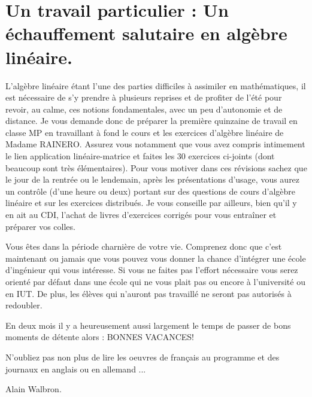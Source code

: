 \section[Un travail particulier]{Un travail particulier : Un échauffement salutaire en algèbre linéaire.} 
L'algèbre linéaire étant l'une des parties difficiles à assimiler en
mathématiques, il est nécessaire de s'y prendre à plusieurs reprises et de
profiter de l'été pour revoir, au calme, ces notions fondamentales, avec un peu
d'autonomie et de distance. Je vous demande donc de préparer la première
quinzaine de travail en classe MP en travaillant à fond le cours et les
exercices d'algèbre linéaire de Madame RAINERO. Assurez vous notamment que vous
avez compris intimement le lien application linéaire-matrice et faites les 30
exercices ci-joints (dont beaucoup sont très élémentaires).  Pour vous motiver
dans ces révisions sachez que le jour de la rentrée ou le lendemain, après les
présentations d'usage, vous aurez un contrôle (d'une heure ou deux) portant sur
des questions de cours d'algèbre linéaire et sur les exercices distribués.  Je
vous conseille par ailleurs, bien qu'il y en ait au CDI, l'achat de livres
d'exercices corrigés pour vous entraîner et préparer vos colles.

Vous êtes dans la période charnière de votre vie. Comprenez donc que c'est
maintenant ou jamais que vous pouvez vous donner la chance d'intégrer une école
d'ingénieur qui vous intéresse. Si vous ne faites pas l'effort nécessaire vous
serez orienté par défaut dans une école qui ne vous plait pas ou encore à
l'université ou en IUT.  De plus, les élèves qui n'auront pas travaillé ne
seront pas autorisés à redoubler.

En deux mois il y a heureusement aussi largement le temps de passer de bons
moments de détente alors : BONNES VACANCES!

N'oubliez pas non plus de lire les oeuvres de français au programme et des
journaux en anglais ou en allemand ...

Alain Walbron.
